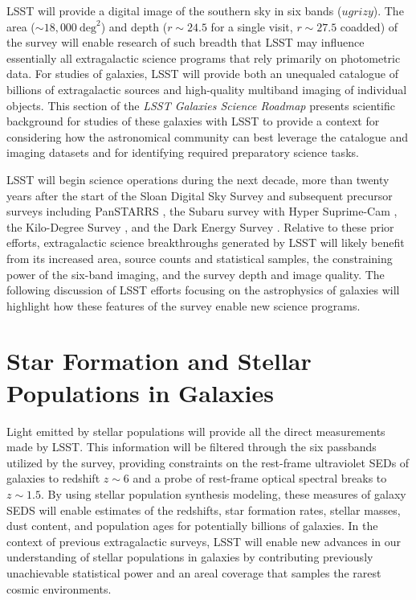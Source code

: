 {LSST will provide a 
digital image of the southern sky in six bands ($ugrizy$).
The area ($\sim18,000~\mathrm{deg}^2$) and depth 
($r\sim24.5$ for a single visit, $r\sim27.5$ coadded) of
the survey will enable research of such breadth
that LSST may influence essentially all extragalactic 
science programs that rely primarily on photometric data.
For studies of galaxies, LSST will provide both an unequaled 
catalogue of billions of extragalactic sources and high-quality 
multiband imaging of individual objects. This section of
the {\it LSST Galaxies Science Roadmap} presents scientific
background for studies of these galaxies with LSST to provide a
context for considering how the astronomical community can
best leverage the catalogue and imaging datasets and for
identifying required preparatory science tasks.

LSST will begin science operations during the next decade,
more than twenty years after the start of the Sloan
Digital Sky Survey \citep{york2000a} and subsequent precursor surveys
including PanSTARRS \citep{kaiser2010a}, the Subaru
survey with Hyper Suprime-Cam \citep{miyazaki2012a}, the
Kilo-Degree Survey \citep{dejong2015a}, and the Dark
Energy Survey \citep{flaugher2005a}. Relative to these prior
efforts, extragalactic science breakthroughs
generated by LSST will likely benefit from its increased area, source
counts and statistical samples, the constraining power of the
six-band imaging, and the survey depth and image quality. The following
discussion of LSST efforts focusing on the astrophysics of galaxies
will highlight how these features of the survey enable new science
programs.



\section{Star Formation and Stellar Populations in Galaxies}
\label{sec:sci:gal:bkgnd:stars}

Light emitted by stellar populations will
provide all the direct measurements made by
LSST. This information will be filtered through
the six passbands utilized by the survey,
providing constraints on the
rest-frame ultraviolet SEDs of galaxies to
redshift $z\sim6$ and a probe of rest-frame
optical spectral breaks to $z\sim1.5$. By
using stellar population synthesis modeling,
these measures of galaxy SEDS will enable 
estimates of the redshifts, star formation rates,
stellar masses, dust content, and 
population ages for potentially 
billions of galaxies. In the context of previous
extragalactic surveys, LSST
will enable new advances in our understanding
of stellar populations in galaxies by contributing
previously unachievable statistical power and an
areal coverage that samples the rarest cosmic
environments.

}
